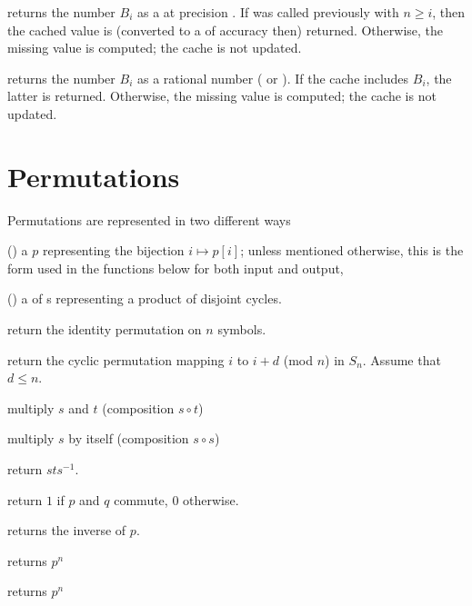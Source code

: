  returns the  number
$B_i$ as a  at precision . If 
was called previously with $n \geq i$, then the cached value is (converted to
a  of accuracy  then) returned. Otherwise, the missing
value is computed; the cache is not updated.

 returns the  number $B_i$ as a
rational number ( or ). If the  cache includes
$B_i$, the latter is returned. Otherwise, the missing value is computed; the
cache is not updated.



\section{Permutations }

\noindent Permutations are represented in two different ways

\item () a  $p$ representing the bijection $i\mapsto
p[i]$; unless mentioned otherwise, this is the form used in the functions
below for both input and output,

\item () a  of s representing a product of
disjoint cycles.

 return the identity permutation on $n$
symbols.

 return the cyclic permutation mapping
$i$ to $i+d$ (mod $n$) in $S_n$. Assume that $d \leq n$.

 multiply $s$ and $t$ (composition $s\circ t$)

 multiply $s$  by itself (composition $s\circ s$)

 return $sts^{-1}$.

 return $1$ if $p$ and $q$ commute, 0
otherwise.

 returns the inverse of $p$.

 returns $p^n$

 returns $p^n$

